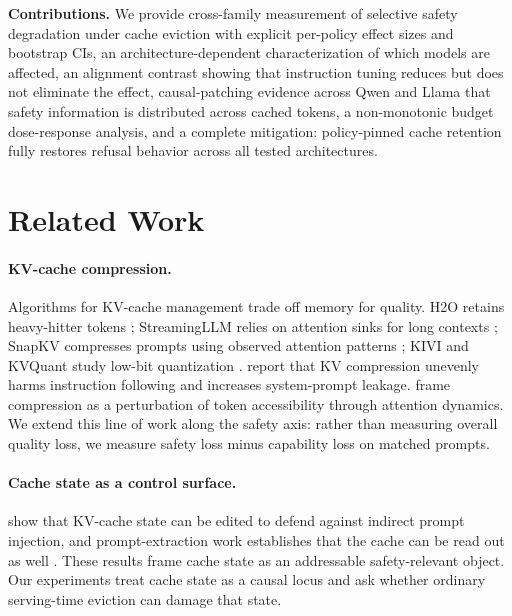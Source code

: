 \documentclass{article}
\begin{document}
\textbf{Contributions.} We provide cross-family measurement of selective safety degradation under cache eviction with explicit per-policy effect sizes and bootstrap CIs, an architecture-dependent characterization of which models are affected, an alignment contrast showing that instruction tuning reduces but does not eliminate the effect, causal-patching evidence across Qwen and Llama that safety information is distributed across cached tokens, a non-monotonic budget dose-response analysis, and a complete mitigation: policy-pinned cache retention fully restores refusal behavior across all tested architectures.

\section{Related Work}

\paragraph{KV-cache compression.}
Algorithms for KV-cache management trade off memory for quality. H2O retains heavy-hitter tokens \citep{zhang2023h2o}; StreamingLLM relies on attention sinks for long contexts \citep{xiao2024streamingllm}; SnapKV compresses prompts using observed attention patterns \citep{li2024snapkv}; KIVI and KVQuant study low-bit quantization \citep{liu2024kivi,hooper2024kvquant}. \citet{chen2025pitfalls} report that KV compression unevenly harms instruction following and increases system-prompt leakage. \citet{ananthanarayanan2026physics} frame compression as a perturbation of token accessibility through attention dynamics. We extend this line of work along the safety axis: rather than measuring overall quality loss, we measure safety loss minus capability loss on matched prompts.

\paragraph{Cache state as a control surface.}
\citet{wang2025cacheprune} show that KV-cache state can be edited to defend against indirect prompt injection, and prompt-extraction work establishes that the cache can be read out as well \citep{hui2024pleak}. These results frame cache state as an addressable safety-relevant object. Our experiments treat cache state as a causal locus and ask whether ordinary serving-time eviction can damage that state.
\end{document}
